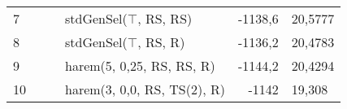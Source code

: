 \documentclass[./FM_mgr.tex]{subfiles}
\begin{document}
\begin{table}[H]
\begin{tabular}{|l|l|l|l|r@{$\pm$}l|}
		7 & &                                        & stdGenSel($\top$, RS, RS)              & -1138,6                 & 20,5777                 \\ \cline{1-1}\cline{4-6} 
		8 & &                                        & stdGenSel($\top$, RS, R)               & -1136,2                 & 20,4783                 \\ \cline{1-1}\cline{4-6} 
		9 & &                                        & harem(5, 0,25, RS, RS, R)              & -1144,2                 & 20,4294                 \\ \cline{1-1}\cline{4-6} 
		10 & &                                        & harem(3, 0,0, RS, TS(2), R)            & -1142                   & 19,308                  \\ \hline
	\end{tabular}
\end{table}
\end{document}
